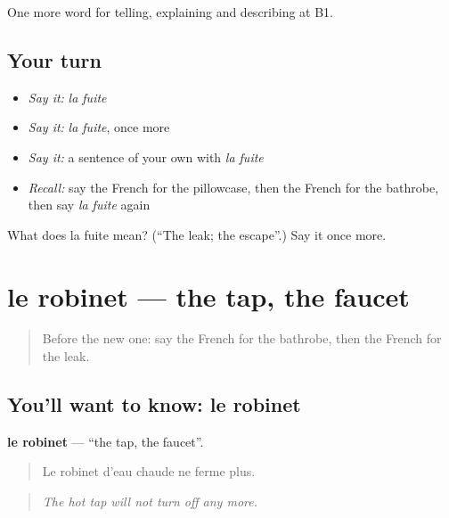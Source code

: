 \begin{grammarlens}[title={What you've built}]
One more word for telling, explaining and describing at B1.
\end{grammarlens}

\subsection*{Your turn}
\begin{itemize}
\raggedright
  \item \emph{Say it:} \emph{la fuite}
  \item \emph{Say it:} \emph{la fuite}, once more
  \item \emph{Say it:} a sentence of your own with \emph{la fuite}
  \item \emph{Recall:} say the French for the pillowcase, then the French for the bathrobe, then say \emph{la fuite} again
\end{itemize}

\begin{tcolorbox}[breakable,colback=teal!4,colframe=teal!35!black,title={Before you move on}]
What does la fuite mean? (\textquotedblleft{}The leak; the escape\textquotedblright{}.) Say it once more.
\end{tcolorbox}
\section[le robinet]{le robinet — the tap, the faucet}

\label{lesson:FR-C428-robinet}



\begin{quote}
Before the new one: say the French for the bathrobe, then the French for the leak.
\end{quote}

\subsection*{You'll want to know: le robinet}
\textbf{le robinet} — \textquotedblleft{}the tap, the faucet\textquotedblright{}.

\begin{quote}
Le robinet d'eau chaude ne ferme plus.
\end{quote}

\begin{quote}
\emph{The hot tap will not turn off any more.}
\end{quote}

